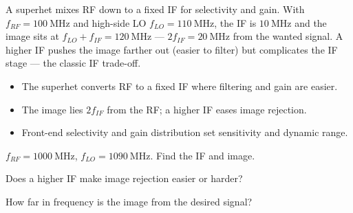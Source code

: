 \begin{workedexample}
A superhet mixes RF down to a fixed IF for selectivity and gain. With
$f_{RF} = 100\ \text{MHz}$ and high-side LO $f_{LO} = 110\ \text{MHz}$, the IF is
$10\ \text{MHz}$ and the image sits at $f_{LO} + f_{IF} = 120\ \text{MHz}$ ---
$2f_{IF} = 20\ \text{MHz}$ from the wanted signal. A higher IF pushes the image
farther out (easier to filter) but complicates the IF stage --- the classic IF
trade-off.
\end{workedexample}

\begin{keytakeaways}
\begin{itemize}[leftmargin=1.4em,itemsep=2pt]
\item The superhet converts RF to a fixed IF where filtering and gain are easier.
\item The image lies $2f_{IF}$ from the RF; a higher IF eases image rejection.
\item Front-end selectivity and gain distribution set sensitivity and dynamic range.
\end{itemize}
\end{keytakeaways}

\begin{exercises}
\item $f_{RF} = 1000\ \text{MHz}$, $f_{LO} = 1090\ \text{MHz}$. Find the IF and image.
\item Does a higher IF make image rejection easier or harder?
\item How far in frequency is the image from the desired signal?
\end{exercises}

